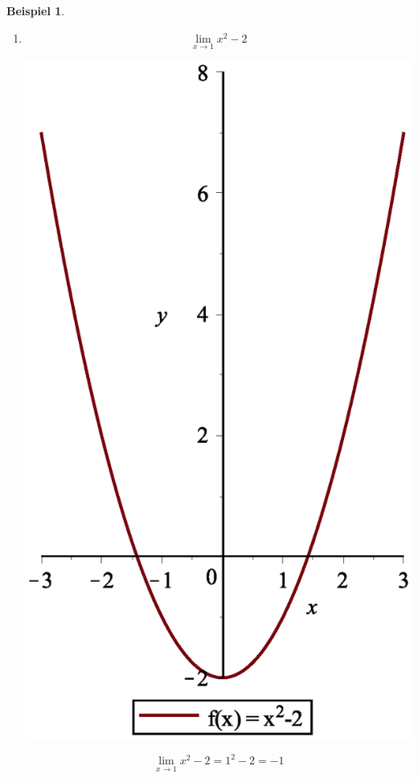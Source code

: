 \documentclass{report}
\newtheorem{myexample}{Beispiel}
\begin{document}
\begin{myexample}\begin{enumerate}
\item \begin{equation}\lim_{x \to 1} x^2-2\end{equation}
\begin{center}\includegraphics[scale=0.2]{images/limes_x2-2.eps}\end{center}
\begin{equation}\lim_{x \to 1} x^2-2 = 1^2 -2 = -1\end{equation}

\end{enumerate}
\end{myexample}
\end{document}
